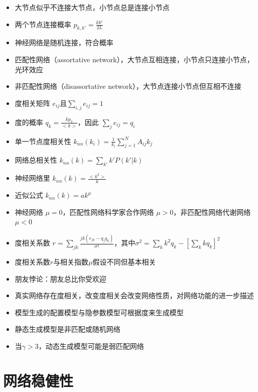 \documentclass[]{book}
\begin{document}
\begin{itemize}
\item
  大节点似乎不连接大节点，小节点总是连接小节点
\item
  两个节点连接概率 \(p_{k,k'} = \frac{kk'}{2L}\)
\item
  神经网络是随机连接，符合概率
\item
  匹配性网络（assortative network），大节点互相连接，小节点只连接小节点，光环效应
\item
  非匹配性网络（disassortative network），大节点连接小节点但互相不连接
\item
  度相关矩阵 \(e_{ij}\)且\(\sum_{i,j}e_{ij} = 1\)
\item
  度的概率 \(q_k = \frac{kp_k}{<k>}\)，因此 \(\sum_je_{ij} = q_i\)
\item
  单一节点度相关性 \(k_{nn}(k_i) = \frac{1}{k_i}\sum_{j=1}^NA_{ij}k_j\)
\item
  网络总相关性 \(k_{nn}(k) = \sum_{k'}k'P(k'|k)\)
\item
  神经网络里 \(k_{nn}(k)=\frac{<k^2>}{k}\)
\item
  近似公式 \(k_{nn}(k)=ak^{\mu}\)
\item
  神经网络 \(\mu = 0\)，匹配性网络科学家合作网络 \(\mu>0\)，非匹配性网络代谢网络 \(\mu<0\)
\item
  度相关系数 \(r=\sum_{jk}\frac{jk(e_{jk}-q_{j}q_{k})}{\sigma^2}\)，其中\(\sigma^2=\sum_{k}k^2q_k - [\sum_kkq_k]^2\)
\item
  度相关系数\(r\)与相关指数\(\mu\)假设不同但基本相关
\item
  朋友悖论：朋友总比你受欢迎
\item
  真实网络存在度相关，改变度相关会改变网络性质，对网络功能的进一步描述
\item
  模型生成的配置模型与隐参数模型可根据度来生成模型
\item
  静态生成模型是非匹配或随机网络
\item
  当\(\gamma>3\)，动态生成模型可能是弱匹配网络
\end{itemize}

\hypertarget{ux7f51ux7edcux7a33ux5065ux6027}{%
\section{网络稳健性}\label{ux7f51ux7edcux7a33ux5065ux6027}}
\end{document}
